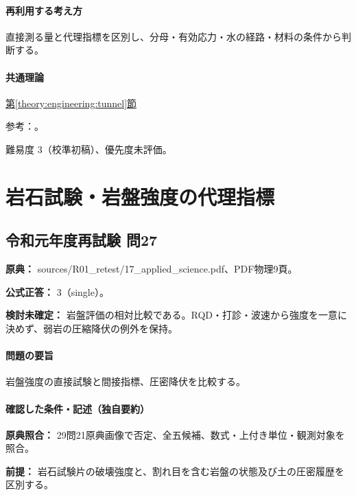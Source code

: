 \paragraph{再利用する考え方} 直接測る量と代理指標を区別し、分母・有効応力・水の経路・材料の条件から判断する。

\paragraph{共通理論} \hyperref[theory:engineering:tunnel]{第\ref*{theory:engineering:tunnel}節}

\par 参考：\cite{eng52_tunnel_ref,eng52_rockburst}。

\par 難易度 3（校準初稿）、優先度未評価。

\section{岩石試験・岩盤強度の代理指標}

\subsection{令和元年度再試験 問27}
\label{q:r01-ret-applied-27}

\noindent\textbf{原典：} sources/R01\_retest/17\_applied\_science.pdf、PDF物理9頁。

\textbf{公式正答：} 3（single）。

\par\textbf{検討未確定：} 岩盤評価の相対比較である。RQD・打診・波速から強度を一意に決めず、弱岩の圧縮降伏の例外を保持。

\paragraph{問題の要旨} 岩盤強度の直接試験と間接指標、圧密降伏を比較する。

\paragraph{確認した条件・記述（独自要約）}\mbox{}\par

\noindent\textbf{原典照合：} 29問21原典画像で否定、全五候補、数式・上付き単位・観測対象を照合。\par

\noindent\textbf{前提：} 岩石試験片の破壊強度と、割れ目を含む岩盤の状態及び土の圧密履歴を区別する。\par

